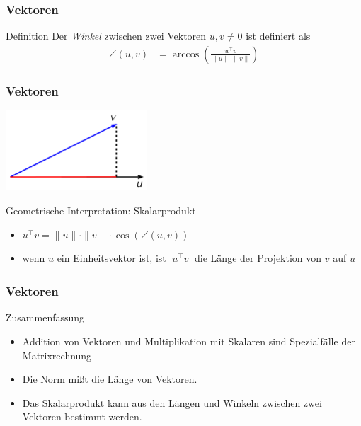 \documentclass{beamer}
\renewcommand{\emph}[1]{{\textcolor{solarizedRed}{\itshape #1}}}
\newcommand\bc[1]{\left({#1}\right)}
\newcommand\bcfr[2]{\bc{\frac{#1}{#2}}}
\newcommand{\trans}{\top}
\renewcommand{\ae}{\"a}
\newcommand{\mytitle}{Vektoren}
\begin{document}
\begin{frame}\frametitle{\mytitle}
	\begin{block}{Definition}
		Der \emph{Winkel} zwischen zwei Vektoren $u,v\neq0$ ist definiert als
		\begin{align*}
			\angle(u,v)&=\arccos\bcfr{u^\trans v}{\|u\|\cdot\|v\|}
		\end{align*}
	\end{block}
\end{frame}

\begin{frame}\frametitle{\mytitle}
	\hfill\includegraphics[height=30mm]{pics/scalarproduct.pdf}
	\begin{block}{Geometrische Interpretation: Skalarprodukt}
		\begin{itemize}
			\item $u^\trans v=\|u\|\cdot\|v\|\cdot\cos(\angle(u,v))$
			\item wenn $u$ ein Einheitsvektor ist, ist $|u^\trans v|$ die L\ae nge der Projektion von $v$ auf $u$
		\end{itemize}
	\end{block}
\end{frame}

\begin{frame}\frametitle{\mytitle}
	\begin{block}{Zusammenfassung}
		\begin{itemize}
			\item Addition von Vektoren und Multiplikation mit Skalaren sind Spezialf\ae lle der Matrixrechnung
			\item Die Norm mi\ss t die L\ae nge von Vektoren.
			\item Das Skalarprodukt kann aus den L\ae ngen und Winkeln zwischen zwei Vektoren bestimmt werden.
		\end{itemize}
	\end{block}
\end{frame}
\end{document}
